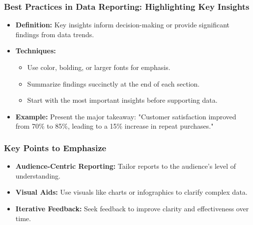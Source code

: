 \documentclass[aspectratio=169]{beamer}
\begin{document}
\begin{frame}[fragile]
    \frametitle{Best Practices in Data Reporting: Highlighting Key Insights}
    \begin{itemize}
        \item \textbf{Definition:} Key insights inform decision-making or provide significant findings from data trends.
        \item \textbf{Techniques:}
        \begin{itemize}
            \item Use color, bolding, or larger fonts for emphasis.
            \item Summarize findings succinctly at the end of each section.
            \item Start with the most important insights before supporting data.
        \end{itemize}
        \item \textbf{Example:} Present the major takeaway: "Customer satisfaction improved from 70\% to 85\%, leading to a 15\% increase in repeat purchases."
    \end{itemize}
\end{frame}

\begin{frame}[fragile]
    \frametitle{Key Points to Emphasize}
    \begin{itemize}
        \item \textbf{Audience-Centric Reporting:} Tailor reports to the audience's level of understanding.
        \item \textbf{Visual Aids:} Use visuals like charts or infographics to clarify complex data.
        \item \textbf{Iterative Feedback:} Seek feedback to improve clarity and effectiveness over time.
    \end{itemize}
\end{frame}
\end{document}
